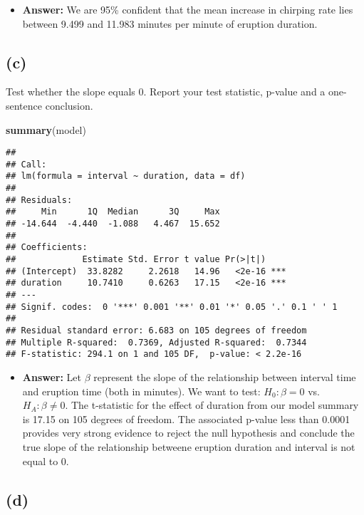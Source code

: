 \documentclass[]{article}
\newenvironment{Shaded}{\begin{snugshade}}{\end{snugshade}}
\newcommand{\KeywordTok}[1]{\textcolor[rgb]{0.13,0.29,0.53}{\textbf{#1}}}
\newcommand{\NormalTok}[1]{#1}
\providecommand{\tightlist}{%
  \setlength{\itemsep}{0pt}\setlength{\parskip}{0pt}}
\begin{document}
\begin{itemize}
\tightlist
\item
  \textbf{Answer:} We are 95\% confident that the mean increase in
  chirping rate lies between 9.499 and 11.983 minutes per minute of
  eruption duration.
\end{itemize}

\subsection{(c)}\label{c-1}

Test whether the slope equals 0. Report your test statistic, p-value and
a one-sentence conclusion.

\begin{Shaded}
\begin{Highlighting}[]
\KeywordTok{summary}\NormalTok{(model)}
\end{Highlighting}
\end{Shaded}

\begin{verbatim}
## 
## Call:
## lm(formula = interval ~ duration, data = df)
## 
## Residuals:
##     Min      1Q  Median      3Q     Max 
## -14.644  -4.440  -1.088   4.467  15.652 
## 
## Coefficients:
##             Estimate Std. Error t value Pr(>|t|)    
## (Intercept)  33.8282     2.2618   14.96   <2e-16 ***
## duration     10.7410     0.6263   17.15   <2e-16 ***
## ---
## Signif. codes:  0 '***' 0.001 '**' 0.01 '*' 0.05 '.' 0.1 ' ' 1
## 
## Residual standard error: 6.683 on 105 degrees of freedom
## Multiple R-squared:  0.7369, Adjusted R-squared:  0.7344 
## F-statistic: 294.1 on 1 and 105 DF,  p-value: < 2.2e-16
\end{verbatim}

\begin{itemize}
\tightlist
\item
  \textbf{Answer:} Let \(\beta\) represent the slope of the relationship
  between interval time and eruption time (both in minutes). We want to
  test: \(H_0: \beta = 0\) vs. \(H_A: \beta \neq 0\). The t-statistic
  for the effect of duration from our model summary is 17.15 on 105
  degrees of freedom. The associated p-value less than 0.0001 provides
  very strong evidence to reject the null hypothesis and conclude the
  true slope of the relationship betweene eruption duration and interval
  is not equal to 0.
\end{itemize}

\subsection{(d)}\label{d-1}
\end{document}
